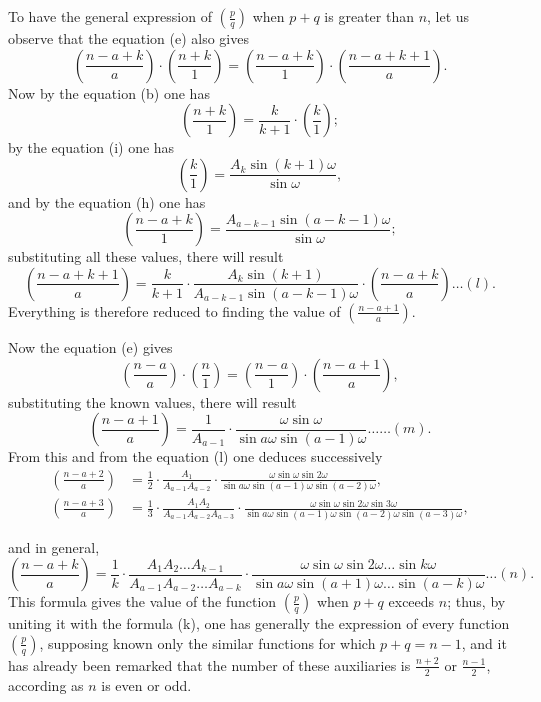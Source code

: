\documentclass{article}
\begin{document}
To have the general expression of $\left(\frac{p}{q}\right)$ when $p+q$ is greater than $n$, let us observe that the equation (e) also gives
\[ \left(\frac{n-a+k}{a}\right)\cdot\left(\frac{n+k}{1}\right)=\left(\frac{n-a+k}{1}\right)\cdot\left(\frac{n-a+k+1}{a}\right). \]
Now by the equation (b) one has
\[ \left(\frac{n+k}{1}\right)=\frac{k}{k+1}\cdot\left(\frac{k}{1}\right); \]
by the equation (i) one has
\[ \left(\frac{k}{1}\right)=\frac{A_{k}\sin(k+1)\omega}{\sin\omega}, \]
and by the equation (h) one has
\[ \left(\frac{n-a+k}{1}\right)=\frac{A_{a-k-1}\sin(a-k-1)\omega}{\sin\omega}; \]
substituting all these values, there will result
\[ \left(\frac{n-a+k+1}{a}\right)=\frac{k}{k+1}\cdot\frac{A_{k}\sin(k+1)}{A_{a-k-1}\sin(a-k-1)\omega}\cdot\left(\frac{n-a+k}{a}\right)\ldots(l). \]
Everything is therefore reduced to finding the value of $\left(\frac{n-a+1}{a}\right)$.

Now the equation (e) gives
\[ \left(\frac{n-a}{a}\right)\cdot\left(\frac{n}{1}\right)=\left(\frac{n-a}{1}\right)\cdot\left(\frac{n-a+1}{a}\right), \]
substituting the known values, there will result
\[ \left(\frac{n-a+1}{a}\right)=\frac{1}{A_{a-1}}\cdot\frac{\omega\sin\omega}{\sin a\omega\sin(a-1)\omega}\ldots\ldots(m). \]
From this and from the equation (l) one deduces successively
\[ \begin{aligned} \left(\frac{n-a+2}{a}\right)&=\frac{1}{2}\cdot\frac{A_{1}}{A_{a-1}A_{a-2}}\cdot\frac{\omega\sin\omega\sin 2\omega}{\sin a\omega\sin(a-1)\omega\sin(a-2)\omega},\\ \left(\frac{n-a+3}{a}\right)&=\frac{1}{3}\cdot\frac{A_{1}A_{2}}{A_{a-1}A_{a-2}A_{a-3}}\cdot\frac{\omega\sin\omega\sin 2\omega\sin 3\omega}{\sin a\omega\sin(a-1)\omega\sin(a-2)\omega\sin(a-3)\omega}, \end{aligned} \]

and in general,
\[ \left(\frac{n-a+k}{a}\right)=\frac{1}{k}\cdot\frac{A_{1}A_{2}\ldots A_{k-1}}{A_{a-1}A_{a-2}\ldots A_{a-k}}\cdot\frac{\omega\sin\omega\sin 2\omega\ldots\sin k\omega}{\sin a\omega\sin(a+1)\omega\ldots\sin(a-k)\omega}\ldots(n). \]
This formula gives the value of the function $\left(\frac{p}{q}\right)$ when $p+q$ exceeds $n$; thus, by uniting it with the formula (k), one has generally the expression of every function $\left(\frac{p}{q}\right)$, supposing known only the similar functions for which $p+q=n-1$, and it has already been remarked that the number of these auxiliaries is $\frac{n+2}{2}$ or $\frac{n-1}{2}$, according as $n$ is even or odd.
\end{document}
